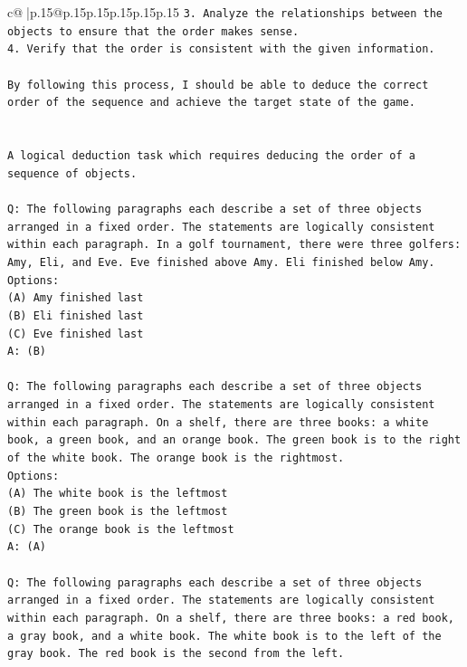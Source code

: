 \documentclass{article}
\begin{document}
{\begin{supertabular}{c@{$\;$}|p{.15\linewidth}@{}p{.15\linewidth}p{.15\linewidth}p{.15\linewidth}p{.15\linewidth}p{.15\linewidth}}
{{{\texttt{3. Analyze the relationships between the objects to ensure that the order makes sense.} \\
\texttt{4. Verify that the order is consistent with the given information.} \\
\\ 
\texttt{By following this process, I should be able to deduce the correct order of the sequence and achieve the target state of the game.} \\
\\ 
\\ 
\texttt{A logical deduction task which requires deducing the order of a sequence of objects.} \\
\\ 
\texttt{Q: The following paragraphs each describe a set of three objects arranged in a fixed order. The statements are logically consistent within each paragraph. In a golf tournament, there were three golfers: Amy, Eli, and Eve. Eve finished above Amy. Eli finished below Amy.} \\
\texttt{Options:} \\
\texttt{(A) Amy finished last} \\
\texttt{(B) Eli finished last} \\
\texttt{(C) Eve finished last} \\
\texttt{A: (B)} \\
\\ 
\texttt{Q: The following paragraphs each describe a set of three objects arranged in a fixed order. The statements are logically consistent within each paragraph. On a shelf, there are three books: a white book, a green book, and an orange book. The green book is to the right of the white book. The orange book is the rightmost.} \\
\texttt{Options:} \\
\texttt{(A) The white book is the leftmost} \\
\texttt{(B) The green book is the leftmost} \\
\texttt{(C) The orange book is the leftmost} \\
\texttt{A: (A)} \\
\\ 
\texttt{Q: The following paragraphs each describe a set of three objects arranged in a fixed order. The statements are logically consistent within each paragraph. On a shelf, there are three books: a red book, a gray book, and a white book. The white book is to the left of the gray book. The red book is the second from the left.} \\
}}}
\end{supertabular}}
\end{document}
